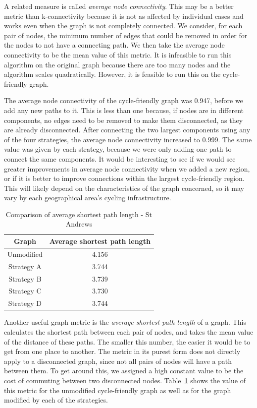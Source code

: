 \documentclass[12pt,a4paper]{report}
\begin{document}
A related measure is called \textit{average node connectivity}. This may be a better metric than k-connectivity because it is not as affected by individual cases and works even when the graph is not completely connected. We consider, for each pair of nodes, the minimum number of edges that could be removed in order for the nodes to not have a connecting path. We then take the average node connectivity to be the mean value of this metric. It is infeasible to run this algorithm on the original graph because there are too many nodes and the algorithm scales quadratically. However, it is feasible to run this on the cycle-friendly graph.

The average node connectivity of the cycle-friendly graph was 0.947, before we add any new paths to it. This is less than one because, if nodes are in different components, no edges need to be removed to make them disconnected, as they are already disconnected. After connecting the two largest components using any of the four strategies, the average node connectivity increased to 0.999. The same value was given by each strategy, because we were only adding one path to connect the same components. It would be interesting to see if we would see greater improvements in average node connectivity when we added a new region, or if it is better to improve connections within the largest cycle-friendly region. This will likely depend on the characteristics of the graph concerned, so it may vary by each geographical area's cycling infrastructure.

\begin{table}[ht]
    \centering
    \begin{tabular}{|c|c|}
        \hline
        Graph & Average shortest path length \\
        \hline
        Unmodified & 4.156 \\
        Strategy A & 3.744 \\
        Strategy B & 3.739 \\
        Strategy C & 3.730 \\
        Strategy D & 3.744 \\
        \hline
    \end{tabular}
    \caption{Comparison of average shortest path length - St Andrews}
    \label{tab:avg st andrews}
\end{table}

Another useful graph metric is the \textit{average shortest path length} of a graph. This calculates the shortest path between each pair of nodes, and takes the mean value of the distance of these paths. The smaller this number, the easier it would be to get from one place to another. The metric in its purest form does not directly apply to a disconnected graph, since not all pairs of nodes will have a path between them. To get around this, we assigned a high constant value to be the cost of commuting between two disconnected nodes. Table~\ref{tab:avg st andrews} shows the value of this metric for the unmodified cycle-friendly graph as well as for the graph modified by each of the strategies.
\end{document}
